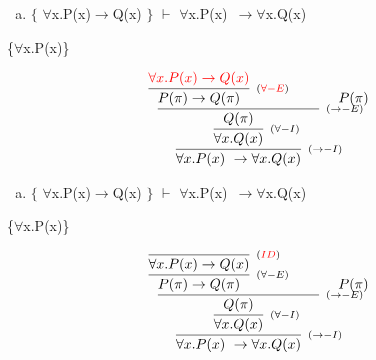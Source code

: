 \documentclass[aspectratio=43]{beamer}
\newcommand{\ria}{$\rightarrow$}
\newcommand{\fall}{$\forall$}
\begin{document}
    \begin{frame}[fragile]
    
    	\begin{enumerate}[f)]
			\item $\{$ \fall x.P(x)\ria Q(x) $\}$ $\vdash$ \fall x.P(x)\ \ria \fall x.Q(x) \\
		\end{enumerate}
        \{\fall x.P(x)\}
        \vspace{45pt}
        
        \[
        \begin{array}{c}
		
        	\infer[_{(\to -I)}]
            	{\forall x.P(x)\ \to \forall x.Q(x)}
            	{\infer[_{(\forall -I)}] 
                	{\forall x.Q(x)}
                    {\infer[_{(\to -E)}]
                    	{Q(\pi)}
                        {\infer[_{(\textcolor{red}{\forall -E})}]
                        	{P(\pi)\rightarrow Q(\pi)}
                            {\textcolor{red}{\forall x.P(x)\to Q(x)}}
                        \hspace{35pt} 
                        P(\pi)
                        }
                    }
                 }   
        
		\end{array}
        \]
        
	\end{frame}
    
    \begin{frame}[fragile]
    
    	\begin{enumerate}[f)]
			\item $\{$ \fall x.P(x)\ria Q(x) $\}$ $\vdash$ \fall x.P(x)\ \ria \fall x.Q(x) \\
		\end{enumerate}
        \{\fall x.P(x)\}
        \vspace{45pt}
        
        \[
        \begin{array}{c}
		
        	\infer[_{(\to -I)}]
            	{\forall x.P(x)\ \to \forall x.Q(x)}
            	{\infer[_{(\forall -I)}] 
                	{\forall x.Q(x)}
                    {\infer[_{(\to -E)}]
                    	{Q(\pi)}
                        {\infer[_{(\forall -E)}]
                        	{P(\pi)\rightarrow Q(\pi)}
                            {\infer[_{(\textcolor{red}{ID})}]
                            	{\forall x.P(x)\to Q(x)}
                            	{}
                            }
                        \hspace{35pt} 
                        P(\pi)
                        }
                    }
                 }   
        
		\end{array}
        \]
        
	\end{frame}
    
\end{document}

